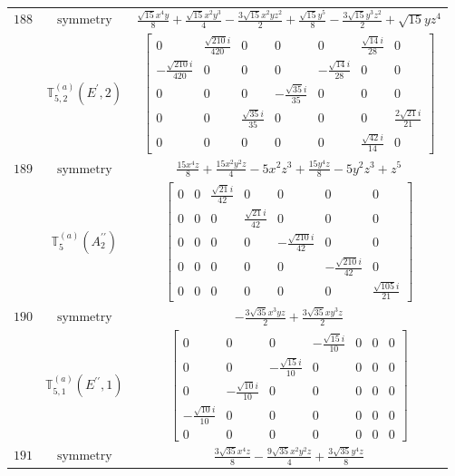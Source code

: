 \documentclass[fleqn,8pt,landscape]{jsarticle}
\begin{document}
\begin{longtable}{ccc}
$ 188 $ & $ \text{symmetry} $ & $ \frac{\sqrt{15} x^{4} y}{8} + \frac{\sqrt{15} x^{2} y^{3}}{4} - \frac{3 \sqrt{15} x^{2} y z^{2}}{2} + \frac{\sqrt{15} y^{5}}{8} - \frac{3 \sqrt{15} y^{3} z^{2}}{2} + \sqrt{15} y z^{4} $ \\
$  $ & $ \mathbb{T}_{5,2}^{(a)}(E^{\prime},2) $ & $ \begin{bmatrix} 0 & \frac{\sqrt{210} i}{420} & 0 & 0 & 0 & \frac{\sqrt{14} i}{28} & 0 \\ - \frac{\sqrt{210} i}{420} & 0 & 0 & 0 & - \frac{\sqrt{14} i}{28} & 0 & 0 \\ 0 & 0 & 0 & - \frac{\sqrt{35} i}{35} & 0 & 0 & 0 \\ 0 & 0 & \frac{\sqrt{35} i}{35} & 0 & 0 & 0 & \frac{2 \sqrt{21} i}{21} \\ 0 & 0 & 0 & 0 & 0 & \frac{\sqrt{42} i}{14} & 0 \end{bmatrix} $ \\ \hline
$ 189 $ & $ \text{symmetry} $ & $ \frac{15 x^{4} z}{8} + \frac{15 x^{2} y^{2} z}{4} - 5 x^{2} z^{3} + \frac{15 y^{4} z}{8} - 5 y^{2} z^{3} + z^{5} $ \\
$  $ & $ \mathbb{T}_{5}^{(a)}(A_{2}^{\prime\prime}) $ & $ \begin{bmatrix} 0 & 0 & \frac{\sqrt{21} i}{42} & 0 & 0 & 0 & 0 \\ 0 & 0 & 0 & \frac{\sqrt{21} i}{42} & 0 & 0 & 0 \\ 0 & 0 & 0 & 0 & - \frac{\sqrt{210} i}{42} & 0 & 0 \\ 0 & 0 & 0 & 0 & 0 & - \frac{\sqrt{210} i}{42} & 0 \\ 0 & 0 & 0 & 0 & 0 & 0 & \frac{\sqrt{105} i}{21} \end{bmatrix} $ \\ \hline
$ 190 $ & $ \text{symmetry} $ & $ - \frac{3 \sqrt{35} x^{3} y z}{2} + \frac{3 \sqrt{35} x y^{3} z}{2} $ \\
$  $ & $ \mathbb{T}_{5,1}^{(a)}(E^{\prime\prime},1) $ & $ \begin{bmatrix} 0 & 0 & 0 & - \frac{\sqrt{15} i}{10} & 0 & 0 & 0 \\ 0 & 0 & - \frac{\sqrt{15} i}{10} & 0 & 0 & 0 & 0 \\ 0 & - \frac{\sqrt{10} i}{10} & 0 & 0 & 0 & 0 & 0 \\ - \frac{\sqrt{10} i}{10} & 0 & 0 & 0 & 0 & 0 & 0 \\ 0 & 0 & 0 & 0 & 0 & 0 & 0 \end{bmatrix} $ \\ \hline
$ 191 $ & $ \text{symmetry} $ & $ \frac{3 \sqrt{35} x^{4} z}{8} - \frac{9 \sqrt{35} x^{2} y^{2} z}{4} + \frac{3 \sqrt{35} y^{4} z}{8} $ \\

\end{longtable}
\end{document}
